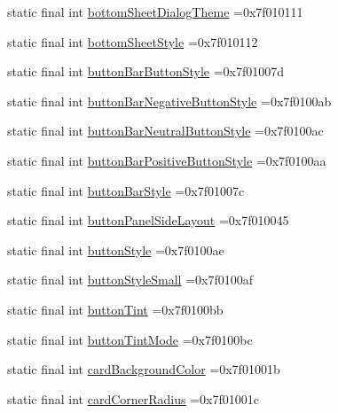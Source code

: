 \begin{DoxyCompactItemize}
\item 
static final int \hyperlink{classproject4_1_1xaria_1_1R_1_1attr_ae6a88102a1ce06b9b5520fc892ddcf76}{bottom\+Sheet\+Dialog\+Theme} =0x7f010111
\item 
static final int \hyperlink{classproject4_1_1xaria_1_1R_1_1attr_a15c9db50a7f3e3717f51e1b9d63791db}{bottom\+Sheet\+Style} =0x7f010112
\item 
static final int \hyperlink{classproject4_1_1xaria_1_1R_1_1attr_a69da0fd347d0a739ab7d9c4b10a1c0d1}{button\+Bar\+Button\+Style} =0x7f01007d
\item 
static final int \hyperlink{classproject4_1_1xaria_1_1R_1_1attr_ad57aa1bd7993affe0fbaadfb8f07748c}{button\+Bar\+Negative\+Button\+Style} =0x7f0100ab
\item 
static final int \hyperlink{classproject4_1_1xaria_1_1R_1_1attr_a8f089c80a964d4336181559f1fe82708}{button\+Bar\+Neutral\+Button\+Style} =0x7f0100ac
\item 
static final int \hyperlink{classproject4_1_1xaria_1_1R_1_1attr_ab5e2bcb21e4e4d05f1b1da0ef2dd1099}{button\+Bar\+Positive\+Button\+Style} =0x7f0100aa
\item 
static final int \hyperlink{classproject4_1_1xaria_1_1R_1_1attr_aa3d266ef99f9cefaee6e57f683ba6e2c}{button\+Bar\+Style} =0x7f01007c
\item 
static final int \hyperlink{classproject4_1_1xaria_1_1R_1_1attr_a58666745fb681df1c256d5706f423025}{button\+Panel\+Side\+Layout} =0x7f010045
\item 
static final int \hyperlink{classproject4_1_1xaria_1_1R_1_1attr_aa307580c654f813f1b53ced93e899f0d}{button\+Style} =0x7f0100ae
\item 
static final int \hyperlink{classproject4_1_1xaria_1_1R_1_1attr_a35225ac12d9f0125dce37d13b1e42530}{button\+Style\+Small} =0x7f0100af
\item 
static final int \hyperlink{classproject4_1_1xaria_1_1R_1_1attr_aeed96d7d83e1cae869cb36d92d2a8a0c}{button\+Tint} =0x7f0100bb
\item 
static final int \hyperlink{classproject4_1_1xaria_1_1R_1_1attr_aa6f5c404a1e2fa114a0873395ae394f3}{button\+Tint\+Mode} =0x7f0100bc
\item 
static final int \hyperlink{classproject4_1_1xaria_1_1R_1_1attr_aaa496716d64819ec82caf18d319ba494}{card\+Background\+Color} =0x7f01001b
\item 
static final int \hyperlink{classproject4_1_1xaria_1_1R_1_1attr_a32f29ace983f57e07e09c0f87765b221}{card\+Corner\+Radius} =0x7f01001c
\item 

\end{DoxyCompactItemize}
